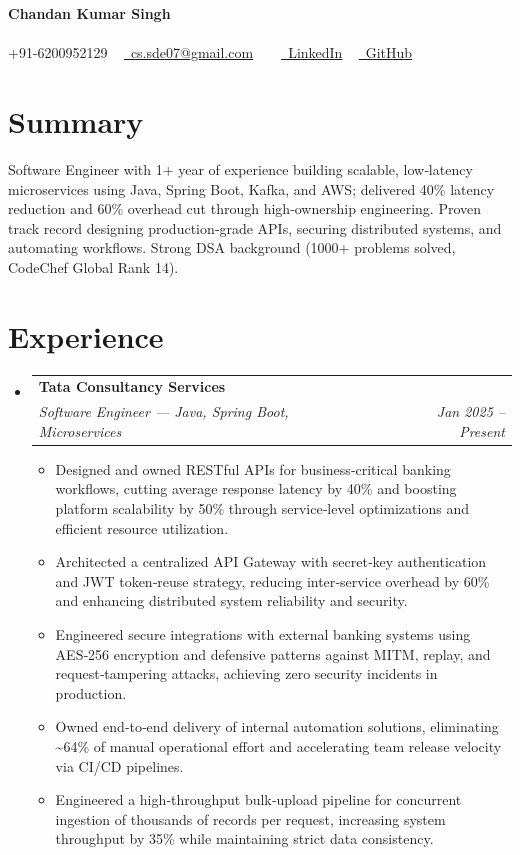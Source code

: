 \documentclass[10pt, letterpaper]{article}
\makeatletter
\newcommand{\resumeItem}[1]{
  \item\small{
    {#1 \vspace{-2pt}}
  }
}
\newcommand{\resumeSubheading}[4]{
  \vspace{-2pt}\item
    \begin{tabular*}{1.0\textwidth}[t]{l@{\extracolsep{\fill}}r}
      \textbf{#1} & \textbf{\small #2} \\
      \textit{\small#3} & \textit{\small #4} \\
    \end{tabular*}\vspace{-7pt}
}
\newcommand{\resumeSubHeadingListStart}{\begin{itemize}[leftmargin=0.0in, label={}]}
\newcommand{\resumeSubHeadingListEnd}{\end{itemize}}
\newcommand{\resumeItemListStart}{\begin{itemize}[leftmargin=0.15in]}
\newcommand{\resumeItemListEnd}{\end{itemize}\vspace{-5pt}}
\makeatother
\begin{document}
\begin{center}
    {\Huge \bfseries Chandan Kumar Singh} \\ \vspace{5pt}
    ~ \\ \vspace{5pt}
    \small \faPhone* +91-6200952129 ~ 
    \href{mailto:cs.sde07@gmail.com}{\faEnvelope~cs.sde07@gmail.com} ~ 
     ~ \href{LinkedIn}{\faLinkedin~LinkedIn}
     ~ \href{GitHub}{\faGithub~GitHub}
    
\end{center}

\section{Summary}
Software Engineer with 1+ year of experience building scalable, low‑latency microservices using Java, Spring Boot, Kafka, and AWS; delivered 40\% latency reduction and 60\% overhead cut through high‑ownership engineering. Proven track record designing production‑grade APIs, securing distributed systems, and automating workflows. Strong DSA background (1000+ problems solved, CodeChef Global Rank 14).


\section{Experience}
\resumeSubHeadingListStart
  \resumeSubheading{Tata Consultancy Services}{}{Software Engineer — Java, Spring Boot, Microservices}{Jan 2025 -- Present}
    \resumeItemListStart
      \resumeItem{Designed and owned RESTful APIs for business‑critical banking workflows, cutting average response latency by 40\% and boosting platform scalability by 50\% through service‑level optimizations and efficient resource utilization.}
      \resumeItem{Architected a centralized API Gateway with secret‑key authentication and JWT token‑reuse strategy, reducing inter‑service overhead by 60\% and enhancing distributed system reliability and security.}
      \resumeItem{Engineered secure integrations with external banking systems using AES‑256 encryption and defensive patterns against MITM, replay, and request‑tampering attacks, achieving zero security incidents in production.}
      \resumeItem{Owned end‑to‑end delivery of internal automation solutions, eliminating \textasciitilde{}64\% of manual operational effort and accelerating team release velocity via CI/CD pipelines.}
      \resumeItem{Engineered a high‑throughput bulk‑upload pipeline for concurrent ingestion of thousands of records per request, increasing system throughput by 35\% while maintaining strict data consistency.}
    \resumeItemListEnd
\resumeSubHeadingListEnd
\end{document}
